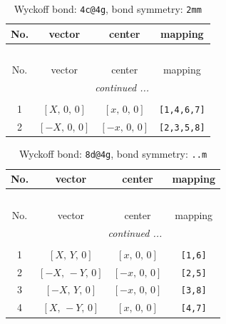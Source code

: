 \documentclass[fleqn,8pt]{jsarticle}
\begin{document}
\begin{longtable}{cccc}
\caption{Wyckoff bond: {\tt 4c@4g}, bond symmetry: {\tt 2mm}}
 \\
 \hline \hline
No. & vector & center & mapping \\ \hline \endfirsthead

\multicolumn{3}{l}{\tablename\ \thetable{}} \\
 \hline \hline
No. & vector & center & mapping \\ \hline \endhead

 \hline \hline
\multicolumn{3}{r}{\footnotesize\it continued ...} \\ \endfoot

 \hline \hline
\multicolumn{3}{r}{} \\ \endlastfoot

1 & $\left[ X,\, 0,\, 0 \right]$ & $\left[ x,\, 0,\, 0 \right]$ & {\tt [1,4,6,7]} \\ \hline
2 & $\left[ - X,\, 0,\, 0 \right]$ & $\left[ - x,\, 0,\, 0 \right]$ & {\tt [2,3,5,8]} \\
\end{longtable}
\renewcommand{\arraystretch}{1.2}
\begin{longtable}{cccc}
\caption{Wyckoff bond: {\tt 8d@4g}, bond symmetry: {\tt ..m}}
 \\
 \hline \hline
No. & vector & center & mapping \\ \hline \endfirsthead

\multicolumn{3}{l}{\tablename\ \thetable{}} \\
 \hline \hline
No. & vector & center & mapping \\ \hline \endhead

 \hline \hline
\multicolumn{3}{r}{\footnotesize\it continued ...} \\ \endfoot

 \hline \hline
\multicolumn{3}{r}{} \\ \endlastfoot

1 & $\left[ X,\, Y,\, 0 \right]$ & $\left[ x,\, 0,\, 0 \right]$ & {\tt [1,6]} \\ \hline
2 & $\left[ - X,\, - Y,\, 0 \right]$ & $\left[ - x,\, 0,\, 0 \right]$ & {\tt [2,5]} \\ \hline
3 & $\left[ - X,\, Y,\, 0 \right]$ & $\left[ - x,\, 0,\, 0 \right]$ & {\tt [3,8]} \\ \hline
4 & $\left[ X,\, - Y,\, 0 \right]$ & $\left[ x,\, 0,\, 0 \right]$ & {\tt [4,7]} \\
\end{longtable}
\end{document}
